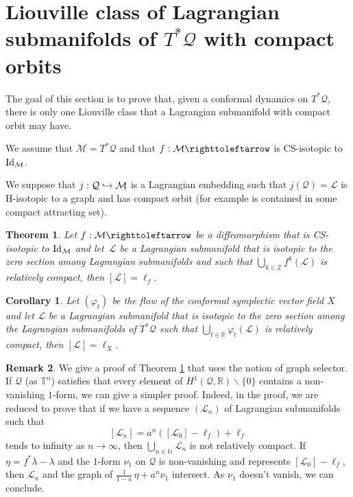 \documentclass[10pt]{amsart}
\def\hto{\mathrel{\lhook\joinrel\to}}
\newtheorem{theorem}{Theorem}
\newtheorem{corollary}{Corollary}
\theoremstyle{definition}
\newtheorem{remark}[theorem]{Remark}
\def\R{\mathbb{R}}
\def\Z{\mathbb{Z}}
\def\N{\mathbb{N}}
\def\T{\mathbb{T}}
\def\cL{{\mathcal L}}
\def\cM{{\mathcal M}}
\def\cQ{{\mathcal Q}}
\begin{document}
\section{Liouville class of Lagrangian submanifolds of \texorpdfstring{$T^*\cQ$}{T*Q} with compact orbits}

The goal of this section is to prove that, given a conformal dynamics on $T^*\cQ$, there is only one Liouville class that a Lagrangian submanifold with compact orbit may have.

We assume that $\cM=T^*\cQ$ and that $f: \cM \righttoleftarrow$ is CS-isotopic to ${\rm Id}_\cM$.

We suppose that $j:\cQ\hto\cM$ is a Lagrangian embedding such that $j(\cQ)=\cL$ is H\nobreakdash-isotopic to a graph and has compact orbit (for example is contained in some compact attracting set).


\begin{theorem}\label{Tcompactexactdiff}
Let $f: \cM \righttoleftarrow$ be a diffeomorphism that is CS-isotopic to ${\rm Id}_\cM$ and let~$\cL$ be a Lagrangian submanifold that is isotopic to the zero section among Lagrangian submanifolds and such that $\bigcup_{k\in\Z}f^k(\cL)$ is relatively compact, then $[\cL]=\ell_f$.
\end{theorem}


\begin{corollary}
Let $(\varphi_t)$ be the flow of the conformal symplectic vector field $X$ and let $\cL$ be a { Lagrangian submanifold that is isotopic to the zero section among the Lagrangian submanifolds} of $T^*\cQ$ such that $\bigcup_{t\in\R}\varphi_t(\cL)$ is relatively compact, then $[\cL]=\ell_X$.
\end{corollary}

\begin{remark}
We give a proof of Theorem \ref{Tcompactexactdiff} that uses the notion of graph selector. If $\cQ$ (as $\T^n$) satisfies that every element of $H^1(\cQ, \R)\backslash\{ 0\}$ contains a non-vanishing $1$\nobreakdash-form, we can give a simpler proof. Indeed, in the proof, we are reduced to prove that if we have a sequence $(\cL_n)$ of Lagrangian submanifolds such that
\[
[ \cL_n]=a^n([\cL_0]-\ell_f)+\ell_f
\]
tends to infinity as $n \to \infty$, then $\bigcup_{n\in\N}\cL_n$ is not relatively compact. If $\eta=f^*\lambda-\lambda$ and the $1$-form $\nu_1$ on $\cQ$ is non-vanishing and represents $[\cL_0]-\ell_f$, then $\cL_n$ and the graph of $\frac{1}{1-a}\,\eta+a^n\nu_1$ intersect. As $\nu_1$ doesn't vanish, we can conclude.
\end{remark}
\end{document}
